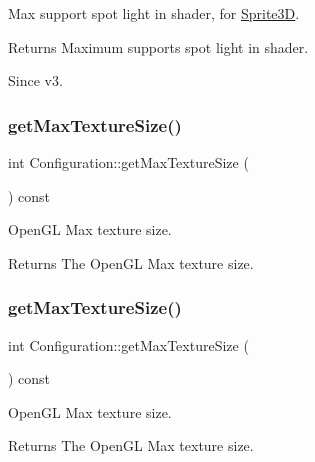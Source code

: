 Max support spot light in shader, for \hyperlink{classSprite3D}{Sprite3D}.

\begin{DoxyReturn}{Returns}
Maximum supports spot light in shader. 
\end{DoxyReturn}
\begin{DoxySince}{Since}
v3. 
\end{DoxySince}
\mbox{\label{classConfiguration_ab57f9e083afc5471f8af07f7d202135b}} 
\subsubsection{\texorpdfstring{get\+Max\+Texture\+Size()}{getMaxTextureSize()}\hspace{0.1cm}{\footnotesize\ttfamily [1/2]}}
{\footnotesize\ttfamily int Configuration\+::get\+Max\+Texture\+Size (\begin{DoxyParamCaption}{ }\end{DoxyParamCaption}) const}

Open\+GL Max texture size.

\begin{DoxyReturn}{Returns}
The Open\+GL Max texture size. 
\end{DoxyReturn}
\mbox{\label{classConfiguration_ab57f9e083afc5471f8af07f7d202135b}} 
\subsubsection{\texorpdfstring{get\+Max\+Texture\+Size()}{getMaxTextureSize()}\hspace{0.1cm}{\footnotesize\ttfamily [2/2]}}
{\footnotesize\ttfamily int Configuration\+::get\+Max\+Texture\+Size (\begin{DoxyParamCaption}{ }\end{DoxyParamCaption}) const}

Open\+GL Max texture size.

\begin{DoxyReturn}{Returns}
The Open\+GL Max texture size. 
\end{DoxyReturn}
\mbox{\label{classConfiguration_ab6b3b10e44ce28029bb9c157a339a91f}} 
